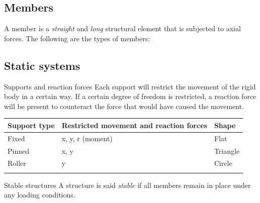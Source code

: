 \documentclass{article}
\begin{document}
\subsection{Members}
A member is a \emph{straight} and \emph{long} structural element that is subjected to axial forces. The following are the types of members:


\subsection{Static systems}
\begin{definition}
    {Supports and reaction forces}
    Each support will restrict the movement of the rigid body in a certain way. If a certain degree of freedom is restricted, a reaction force will be present to counteract the force that would have caused the movement.
    \begin{table}[H]
        \begin{tabular}{lll}
            \textbf{Support type} & \textbf{Restricted movement and reaction forces} & \textbf{Shape} \\ \hline
            Fixed                 & x, y, r (moment)                                 & Flat           \\ \arrayrulecolor{lightgray}\hline
            Pinned                & x, y                                             & Triangle       \\ \arrayrulecolor{lightgray}\hline
            Roller                & y                                                & Circle         \\ \arrayrulecolor{lightgray}\hline
        \end{tabular}
    \end{table}
\end{definition}
\begin{definition}
    {Stable structures}
    A structure is said \emph{stable} if all members remain in place under any loading conditions.
\end{definition}
\end{document}
